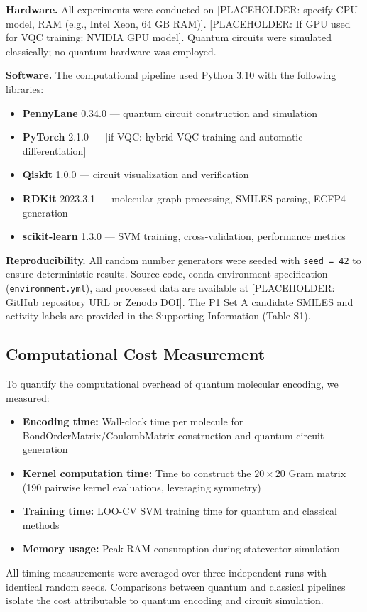\textbf{Hardware.} All experiments were conducted on [PLACEHOLDER: specify CPU model, RAM (e.g., Intel Xeon, 64 GB RAM)]. [PLACEHOLDER: If GPU used for VQC training: NVIDIA GPU model]. Quantum circuits were simulated classically; no quantum hardware was employed.

\textbf{Software.} The computational pipeline used Python 3.10 with the following libraries:
%
\begin{itemize}
    \item \textbf{PennyLane} 0.34.0\cite{Bergholm2018PennyLane} — quantum circuit construction and simulation
    \item \textbf{PyTorch} 2.1.0\cite{PyTorch2019} — [if VQC: hybrid VQC training and automatic differentiation]
    \item \textbf{Qiskit} 1.0.0\cite{Qiskit2023} — circuit visualization and verification
    \item \textbf{RDKit} 2023.3.1\cite{RDKit2023} — molecular graph processing, SMILES parsing, ECFP4 generation
    \item \textbf{scikit-learn} 1.3.0\cite{ScikitLearn2011} — SVM training, cross-validation, performance metrics
\end{itemize}

\textbf{Reproducibility.} All random number generators were seeded with \texttt{seed\,=\,42} to ensure deterministic results. Source code, conda environment specification (\texttt{environment.yml}), and processed data are available at [PLACEHOLDER: GitHub repository URL or Zenodo DOI]. The P1 Set A candidate SMILES and activity labels are provided in the Supporting Information (Table S1).

\subsection{Computational Cost Measurement}
\label{sec:methods:cost}

To quantify the computational overhead of quantum molecular encoding, we measured:
%
\begin{itemize}
    \item \textbf{Encoding time:} Wall-clock time per molecule for BondOrderMatrix/CoulombMatrix construction and quantum circuit generation
    \item \textbf{Kernel computation time:} Time to construct the $20 \times 20$ Gram matrix (190 pairwise kernel evaluations, leveraging symmetry)
    \item \textbf{Training time:} LOO-CV SVM training time for quantum and classical methods
    \item \textbf{Memory usage:} Peak RAM consumption during statevector simulation
\end{itemize}
%
All timing measurements were averaged over three independent runs with identical random seeds. Comparisons between quantum and classical pipelines isolate the cost attributable to quantum encoding and circuit simulation.

